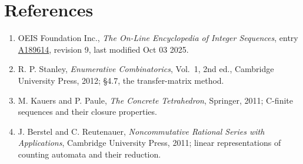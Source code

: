 \documentclass[11pt]{article}
\theoremstyle{definition}
\begin{document}
\section{References}

\begin{enumerate}

\item OEIS Foundation Inc., \emph{The On-Line Encyclopedia of Integer Sequences}, entry \href{https://oeis.org/A189614}{A189614}, revision 9, last modified Oct 03 2025.

\item R. P. Stanley, \emph{Enumerative Combinatorics}, Vol.~1, 2nd ed., Cambridge University Press, 2012; \S4.7, the transfer-matrix method.

\item M. Kauers and P. Paule, \emph{The Concrete Tetrahedron}, Springer, 2011; C-finite sequences and their closure properties.

\item J. Berstel and C. Reutenauer, \emph{Noncommutative Rational Series with Applications}, Cambridge University Press, 2011; linear representations of counting automata and their reduction.

\end{enumerate}
\end{document}
